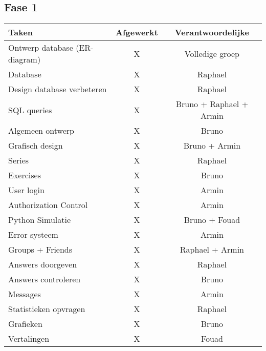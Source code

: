 \subsection{Fase 1}
\begin{tabular}{| l | c | c |}
    \hline
    Taken   &   Afgewerkt   &   Verantwoordelijke \\
    \hline \hline
    Ontwerp database (ER-diagram)   &   X   &   Volledige groep \\
    Database                &   X   &   Raphael \\
    Design database verbeteren  &   X   &   Raphael \\
    SQL queries             &   X   &   Bruno + Raphael + Armin \\
    Algemeen ontwerp        &   X   &   Bruno   \\
    Grafisch design         &   X   &   Bruno + Armin  \\
    Series                  &   X   &   Raphael \\
    Exercises              &   X   &   Bruno   \\
    User login              &   X   &   Armin   \\
    Authorization Control   &   X   &   Armin   \\
    Python Simulatie        &   X   &   Bruno + Fouad   \\
    Error systeem           &   X   &   Armin \\
    Groups + Friends        &   X   &   Raphael + Armin    \\
    Answers doorgeven       &   X   &   Raphael \\
    Answers controleren     &   X   &   Bruno   \\
    Messages                &   X   &   Armin   \\
    Statistieken opvragen   &   X   &   Raphael \\
    Grafieken               &   X   &   Bruno   \\
    Vertalingen             &   X   &   Fouad   \\
    \hline
\end{tabular}


